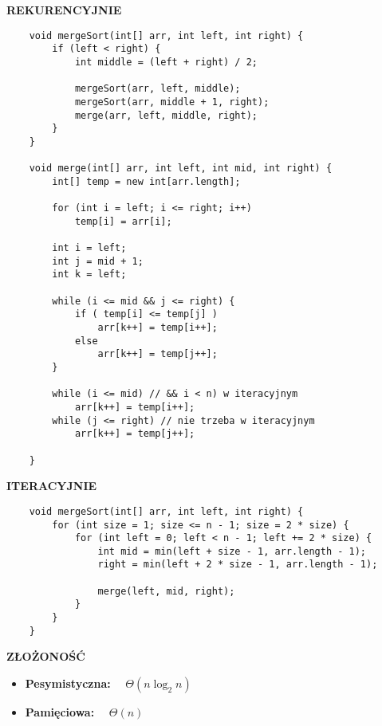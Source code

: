 \documentclass[advanced-sorts.tex]{subfiles}
\begin{document}
    \textbf{REKURENCYJNIE}
    \begin{verbatim}
    void mergeSort(int[] arr, int left, int right) {
        if (left < right) {
            int middle = (left + right) / 2;

            mergeSort(arr, left, middle);
            mergeSort(arr, middle + 1, right);
            merge(arr, left, middle, right);
        }
    }

    void merge(int[] arr, int left, int mid, int right) {
        int[] temp = new int[arr.length];

        for (int i = left; i <= right; i++)
            temp[i] = arr[i];

        int i = left;
        int j = mid + 1;
        int k = left;

        while (i <= mid && j <= right) {
            if ( temp[i] <= temp[j] )
                arr[k++] = temp[i++];
            else
                arr[k++] = temp[j++];
        }

        while (i <= mid) // && i < n) w iteracyjnym
            arr[k++] = temp[i++];
        while (j <= right) // nie trzeba w iteracyjnym
            arr[k++] = temp[j++];

    }
    \end{verbatim}
    \pagebreak

    \textbf{ITERACYJNIE}
    \begin{verbatim}
    void mergeSort(int[] arr, int left, int right) {
        for (int size = 1; size <= n - 1; size = 2 * size) {
            for (int left = 0; left < n - 1; left += 2 * size) {
                int mid = min(left + size - 1, arr.length - 1);
                right = min(left + 2 * size - 1, arr.length - 1);

                merge(left, mid, right);
            }
        }
    }
    \end{verbatim}

    \textbf{ZŁOŻONOŚĆ}
    \begin{itemize}
        \item \textbf{Pesymistyczna:} ~~$\Theta(n \log_2 n)$
        \item \textbf{Pamięciowa:} ~~$\Theta(n)$
    \end{itemize}
\end{document}
